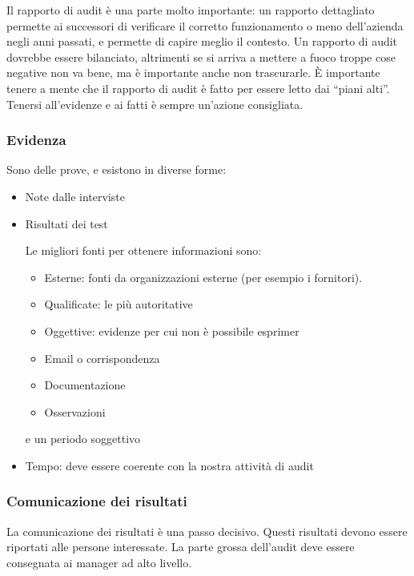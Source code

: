 Il rapporto di audit è una parte molto importante: un rapporto dettagliato permette ai successori di verificare il corretto funzionamento o meno dell'azienda negli anni passati, e permette di capire meglio il contesto. Un rapporto di audit dovrebbe essere bilanciato, altrimenti se si arriva a mettere a fuoco troppe cose negative non va bene, ma è importante anche non trascurarle. È importante tenere a mente che il rapporto di audit è fatto per essere letto dai ``piani alti''. Tenersi all'evidenze e ai fatti è sempre un'azione consigliata.






\subsubsection{Evidenza}

Sono delle prove, e esistono in diverse forme:
\begin{itemize}
\item Note dalle interviste
\item Risultati dei test

Le migliori fonti per ottenere informazioni sono:
\begin{itemize}
\item Esterne: fonti da organizzazioni esterne (per esempio i fornitori).
\item Qualificate: le più autoritative
\item Oggettive: evidenze per cui non è possibile esprimer
\item Email o corrispondenza
\item Documentazione
\item Osservazioni
\end{itemize}e un periodo soggettivo
\item Tempo: deve essere coerente con la nostra attività di audit 
\end{itemize}



\subsubsection{Comunicazione dei risultati}

La comunicazione dei risultati è una passo decisivo. Questi risultati devono essere riportati alle persone interessate.
La parte grossa dell'audit deve essere consegnata ai manager ad alto livello.


